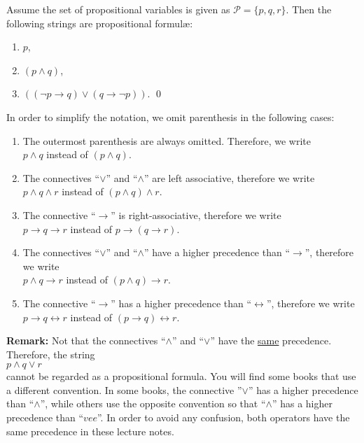 \example 
Assume the set of propositional variables is given as $\mathcal{P} = \{ p, q, r \}$.  Then the
following strings are propositional {formul\ae}:
\begin{enumerate}
\item $p$,
\item $(p \wedge q)$,
\item $((\neg p \rightarrow q) \vee (q \rightarrow \neg p))$.  \qed
\end{enumerate}

\noindent
In order to simplify the notation, we omit parenthesis in the following cases:
\begin{enumerate}
\item The outermost parenthesis are always omitted.  Therefore, we write \\[0.2cm]
      \hspace*{1.3cm} $p \wedge q$ \quad instead of \quad $(p \wedge q)$.
\item The connectives ``$\vee$'' and ``$\wedge$'' are left associative, therefore we write
      \\[0.2cm]
      \hspace*{1.3cm} $p \wedge q \wedge r$ \quad instead of \quad $(p \wedge q) \wedge r$.
\item The connective ``$\rightarrow$'' is right-associative, therefore we write \\[0.2cm]
      \hspace*{1.3cm} $p \rightarrow q \rightarrow r$ \quad instead of 
      \quad $p \rightarrow (q \rightarrow r)$.
\item The connectives  ``$\vee$'' and ``$\wedge$'' have a higher precedence than ``$\rightarrow$'', 
      therefore we write
      \\[0.2cm]
      \hspace*{1.3cm} $p \wedge q \rightarrow r$ \quad instead of \quad $(p \wedge q) \rightarrow r$.
\item The connective ``$\rightarrow$'' has a higher precedence than ``$\leftrightarrow$'', 
      therefore we write \\[0.2cm]
      \hspace*{1.3cm} 
      $p \rightarrow q \leftrightarrow r$ \quad instead of \quad 
      $(p \rightarrow q) \leftrightarrow r$.
\end{enumerate}
\textbf{Remark:}  Not that the connectives ``$\wedge$'' and ``$\vee$'' have the \underline{same}
precedence.  Therefore, the string
\\[0.2cm]
\hspace*{1.3cm}
$p \wedge q \vee r$
\\[0.2cm]
cannot be regarded as a propositional formula.  You will find some books that use a different
convention.  In some books, the connective ''$\vee$'' has a higher precedence than ``$\wedge$'',
while others use the opposite convention so that ``$\wedge$'' has a higher precedence than
``$vee$''.  In order to avoid any confusion, both operators have the same precedence in these
lecture notes.


